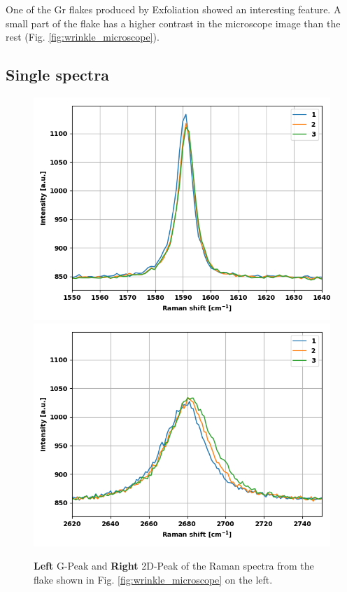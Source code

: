 \documentclass[12pt,a4paper]{article}
\begin{document}
One of the Gr flakes produced by Exfoliation showed an interesting feature. A small part of the flake has a higher contrast in the microscope image than the rest (Fig. \ref{fig:wrinkle_microscope}).


\subsection{Single spectra}

\begin{figure}
\centering
\includegraphics[scale=0.5]{Bilder/Wrinkle/single_spectra/single_spectra_G_peak.PNG}
\includegraphics[scale=0.5]{Bilder/Wrinkle/single_spectra/single_spectra_2D_peak.PNG}
\caption{\textbf{Left} G-Peak and \textbf{Right} 2D-Peak of the Raman spectra from the flake shown in Fig. \ref{fig:wrinkle_microscope} on the left.}
\label{fig:wrinkle_Peaks}
\end{figure}
\end{document}
